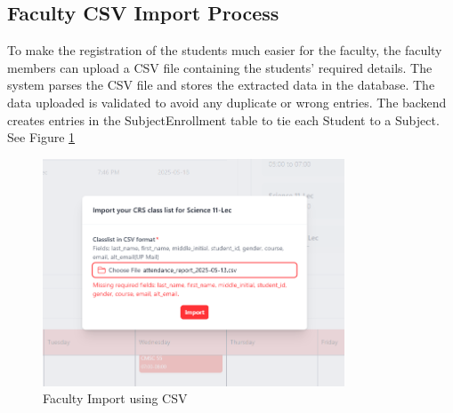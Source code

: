 \subsection{Faculty CSV Import Process}
To make the registration of the students much easier for the faculty, the faculty members can upload a CSV file containing the students' required details. The system parses the CSV file and stores the extracted data in the database. The data uploaded is validated to avoid any duplicate or wrong entries. The backend creates entries in the SubjectEnrollment table to tie each Student to a Subject. See Figure \ref{fig:faculty_import}
\begin{figure}[h] %
	\centering
	\includegraphics[width=0.8\textwidth]{figures/chapter4/faculty_import.png} %
	\caption{Faculty Import using CSV}
	\label{fig:faculty_import}
\end{figure}

